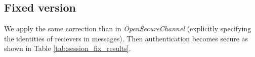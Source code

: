 \subsection{Fixed version}

We apply the same correction than in {\em OpenSecureChannel} (explicitly
specifying the identities of recievers in messages).
Then authentication becomes secure as shown in Table \ref{tab:session_fix_results}.

%
%
%                
%
%                
%                
%                
%
%

